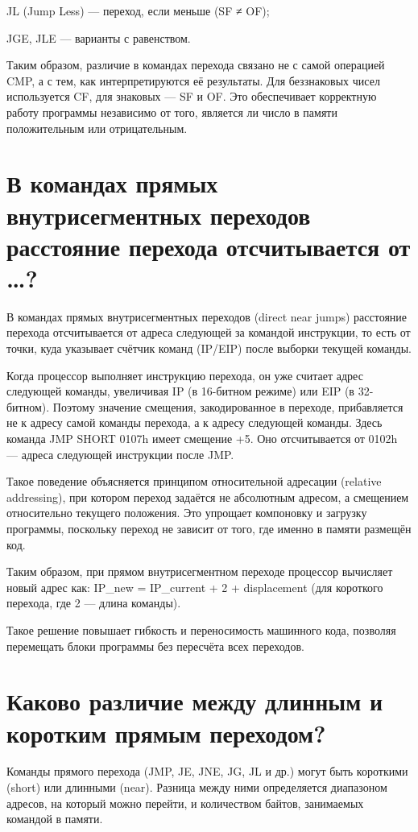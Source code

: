 JL (Jump Less) — переход, если меньше (SF ≠ OF);

JGE, JLE — варианты с равенством.

Таким образом, различие в командах перехода связано не с самой операцией CMP, а с тем, как интерпретируются её результаты. Для беззнаковых чисел используется CF, для знаковых — SF и OF. Это обеспечивает корректную работу программы независимо от того, является ли число в памяти положительным или отрицательным.

\section{В командах прямых внутрисегментных переходов расстояние перехода отсчитывается от \dots ?}

В командах прямых внутрисегментных переходов (direct near jumps) расстояние перехода отсчитывается от адреса следующей за командой инструкции, то есть от точки, куда указывает счётчик команд (IP/EIP) после выборки текущей команды.

Когда процессор выполняет инструкцию перехода, он уже считает адрес следующей команды, увеличивая IP (в 16-битном режиме) или EIP (в 32-битном). Поэтому значение смещения, закодированное в переходе, прибавляется не к адресу самой команды перехода, а к адресу следующей команды.
Здесь команда JMP SHORT 0107h имеет смещение +5. Оно отсчитывается от 0102h — адреса следующей инструкции после JMP.

Такое поведение объясняется принципом относительной адресации (relative addressing), при котором переход задаётся не абсолютным адресом, а смещением относительно текущего положения. Это упрощает компоновку и загрузку программы, поскольку переход не зависит от того, где именно в памяти размещён код.

Таким образом, при прямом внутрисегментном переходе процессор вычисляет новый адрес как:
IP_new = IP_current + 2 + displacement
(для короткого перехода, где 2 — длина команды).

Такое решение повышает гибкость и переносимость машинного кода, позволяя перемещать блоки программы без пересчёта всех переходов.

\section{Каково различие между длинным и коротким прямым переходом?}

Команды прямого перехода (JMP, JE, JNE, JG, JL и др.) могут быть короткими (short) или длинными (near). Разница между ними определяется диапазоном адресов, на который можно перейти, и количеством байтов, занимаемых командой в памяти.

